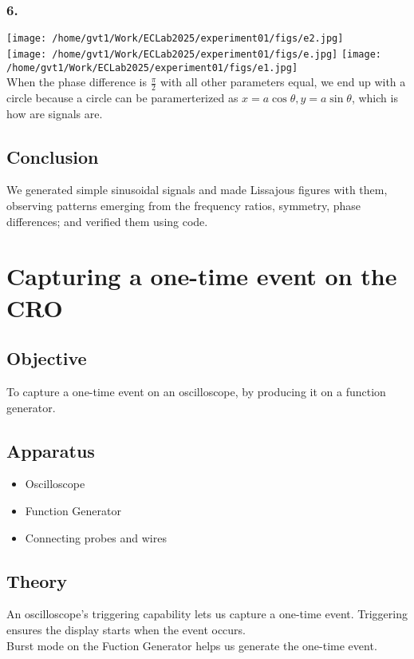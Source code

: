 \documentclass[a4paper,12pt]{article}
\begin{document}
  \subsubsection{6.}
	  \begin{center}
		  \texttt{[image: /home/gvt1/Work/ECLab2025/experiment01/figs/e2.jpg]}\\
		  \texttt{[image: /home/gvt1/Work/ECLab2025/experiment01/figs/e.jpg]}
		  \texttt{[image: /home/gvt1/Work/ECLab2025/experiment01/figs/e1.jpg]}\\
		  When the phase difference is $\frac{\pi}{2}$ with all other parameters equal, we end up with a circle because a circle can be paramerterized as $x = a\cos\theta, y = a\sin\theta$, which is how are signals are.
	  \end{center}
\subsection{Conclusion}
We generated simple sinusoidal signals and made Lissajous figures with them, observing patterns emerging from the frequency ratios, symmetry, phase differences; and verified them using code.
\section{Capturing a one-time event on the CRO}
\subsection{Objective}
To capture a one-time event on an oscilloscope, by producing it on a function generator.
\subsection{Apparatus}
\begin{itemize}
	\item Oscilloscope
	\item Function Generator
	\item Connecting probes and wires
\end{itemize}
\subsection{Theory}
An oscilloscope's triggering capability lets us capture a one-time event. Triggering ensures the display starts when the event occurs.\\
Burst mode on the Fuction Generator helps us generate the one-time event.
\end{document}
